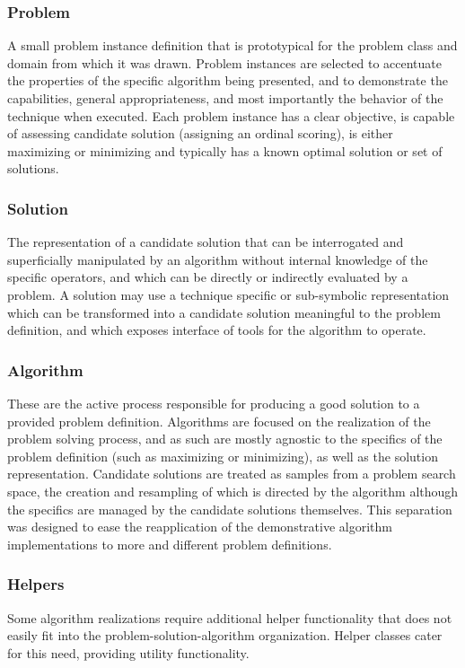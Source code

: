 \subsubsection{Problem} A small problem instance definition that is prototypical for the problem class and domain from which it was drawn. Problem instances are selected to accentuate the properties of the specific algorithm being presented, and to demonstrate the capabilities, general appropriateness, and most importantly the behavior of the technique when executed. Each problem instance has a clear objective, is capable of assessing candidate solution (assigning an ordinal scoring), is either maximizing or minimizing and typically has a known optimal solution or set of solutions.
\subsubsection{Solution} The representation of a candidate solution that can be interrogated and superficially manipulated  by an algorithm without internal knowledge of the specific operators, and which can be directly or indirectly evaluated by a problem. A solution may use a technique specific or sub-symbolic representation which can be transformed into a candidate solution meaningful to the problem definition, and which exposes interface of tools for the algorithm to operate.
\subsubsection{Algorithm} These are the active process responsible for producing a good solution to a provided problem definition. Algorithms are focused on the realization of the problem solving process, and as such are mostly agnostic to the specifics of the problem definition (such as maximizing or minimizing), as well as the solution representation. Candidate solutions are treated as samples from a problem search space, the creation and resampling of which is directed by the algorithm although the specifics are managed by the candidate solutions themselves. This separation was designed to ease the reapplication of the demonstrative algorithm implementations to more and different problem definitions.
\subsubsection{Helpers} Some algorithm realizations require additional helper functionality that does not easily fit into the problem-solution-algorithm organization. Helper classes cater for this need, providing utility functionality.

